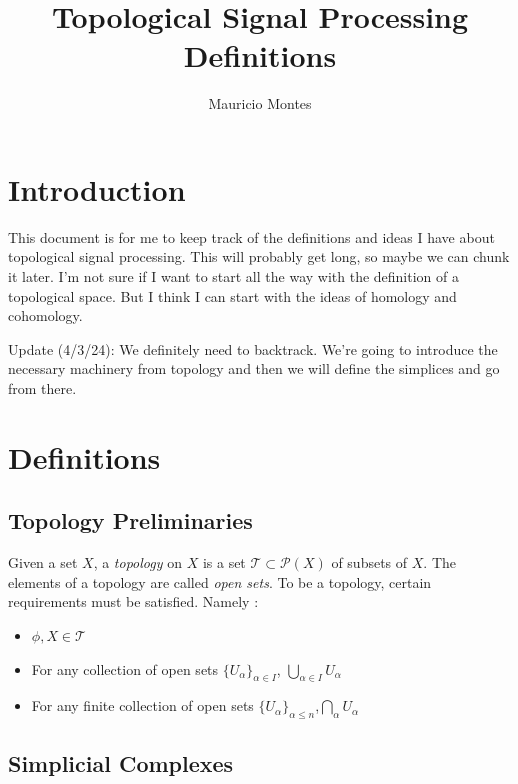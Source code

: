 \documentclass[12pt]{article}
\author{Mauricio Montes}
\title{Topological Signal Processing Definitions}
\begin{document}
\maketitle

\section{Introduction}

This document is for me to keep track of the definitions and ideas I have about topological signal
processing. This will probably get long, so maybe we can chunk it later. I'm not sure if I want to
start all the way with the definition of a topological space. But I think I can start with the ideas
of homology and cohomology. 

Update (4/3/24): We definitely need to backtrack. We're going to introduce the necessary machinery
from topology and then we will define the simplices and go from there.

\section{Definitions}

\subsection{Topology Preliminaries}

Given a set $X$, a \textit{topology} on $X$ is a set $\mathcal{T} \subset \mathcal{P}(X)$ of subsets
of $X$. The elements of a topology are called \textit{open sets}. To be a topology, certain
requirements must be satisfied. Namely :

\begin{itemize}

  \item $\phi, X \in \mathcal{T}$

  \item For any collection of open sets $\{U_\alpha \}_{\alpha \in I}$, $\bigcup_{\alpha \in I} U_\alpha$

  \item For any finite collection of open sets $\{U_\alpha\}_{\alpha \leq n}$,$\bigcap_{\alpha} U_\alpha$
    
\end{itemize}

\subsection{Simplicial Complexes}
\end{document}
